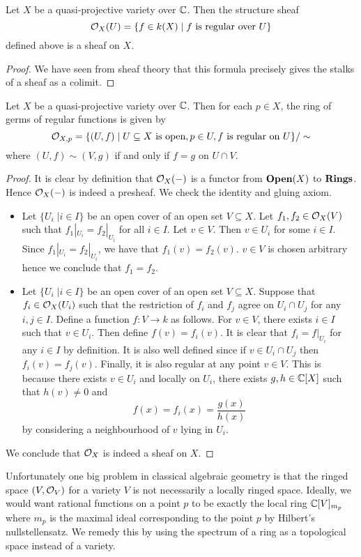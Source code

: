 \documentclass[a4paper]{article}
\begin{document}
\begin{prp}{}{} Let $X$ be a quasi-projective variety over $\mathbb{C}$. Then the structure sheaf $$\mathcal{O}_X(U)=\{f\in k(X)\;|\;f\text{ is regular over }U\}$$ defined above is a sheaf on $X$. \tcbline
\begin{proof}
We have seen from sheaf theory that this formula precisely gives the stalks of a sheaf as a colimit. 
\end{proof}
\end{prp}

\begin{lmm}{}{} Let $X$ be a quasi-projective variety over $\mathbb{C}$. Then for each $p\in X$, the ring of germs of regular functions is given by $$\mathcal{O}_{X,p}=\{(U,f)\;|\;U\subseteq X\text{ is open}, p\in U, f\text{ is regular on }U\}/\sim$$ where $(U,f)\sim(V,g)$ if and only if $f=g$ on $U\cap V$. \tcbline
\begin{proof}
It is clear by definition that $\mathcal{O}_X(-)$ is a functor from $\bold{Open}(X)$ to $\bold{Rings}$. Hence $\mathcal{O}_X(-)$ is indeed a presheaf. We check the identity and gluing axiom. 
\begin{itemize}
\item Let $\{U_i\;|i\in I\}$ be an open cover of an open set $V\subseteq X$. Let $f_1,f_2\in\mathcal{O}_X(V)$ such that $f_1|_{U_i}=f_2|_{U_i}$ for all $i\in I$. Let $v\in V$. Then $v\in U_i$ for some $i\in I$. Since $f_1|_{U_i}=f_2|_{U_i}$, we have that $f_1(v)=f_2(v)$. $v\in V$ is chosen arbitrary hence we conclude that $f_1=f_2$. 
\item Let $\{U_i\;|i\in I\}$ be an open cover of an open set $V\subseteq X$. Suppose that $f_i\in\mathcal{O}_X(U_i)$ such that the restriction of $f_i$ and $f_j$ agree on $U_i\cap U_j$ for any $i,j\in I$. Define a function $f:V\to k$ as follows. For $v\in V$, there exists $i\in I$ such that $v\in U_i$. Then define $f(v)=f_i(v)$. It is clear that $f_i=f|_{U_i}$ for any $i\in I$ by definition. It is also well defined since if $v\in U_i\cap U_j$ then $f_i(v)=f_j(v)$. Finally, it is also regular at any point $v\in V$. This is because there exists $v\in U_i$ and locally on $U_i$, there exists $g,h\in\mathbb{C}[X]$ such that $h(v)\neq 0$ and $$f(x)=f_i(x)=\frac{g(x)}{h(x)}$$ by considering a neighbourhood of $v$ lying in $U_i$. 
\end{itemize}
We conclude that $\mathcal{O}_X$ is indeed a sheaf on $X$. 
\end{proof}
\end{lmm}

Unfortunately one big problem in classical algebraic geometry is that the ringed space $(V,\mathcal{O}_V)$ for a variety $V$ is not necessarily a locally ringed space. Ideally, we would want rational functions on a point $p$ to be exactly the local ring $\mathbb{C}[V]_{m_p}$ where $m_p$ is the maximal ideal corresponding to the point $p$ by Hilbert's nullstellensatz. We remedy this by using the spectrum of a ring as a topological space instead of a variety. 
\end{document}
